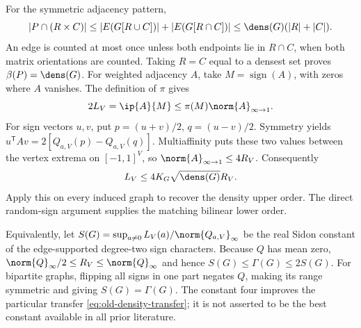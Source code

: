 For the symmetric adjacency pattern,
\[
 |P\cap(R\times C)|\le|E(G[R\cup C])|+|E(G[R\cap C])|
                   \le\dens(G)(|R|+|C|).
\]
An edge is counted at most once unless both endpoints lie in $R\cap C$,
when both matrix orientations are counted. Taking $R=C$ equal to a densest
set proves $\beta(P)=\dens(G)$. For weighted adjacency $A$, take
$M=\operatorname{sign}(A)$, with zeros where $A$ vanishes. The definition
of $\pi$ gives
\[
 2L_V=\ip{A}{M}\le\pi(M)\norm{A}_{\infty\to1}.
\]
For sign vectors $u,v$, put $p=(u+v)/2$, $q=(u-v)/2$. Symmetry yields
$u^{\mathsf T}Av=2[Q_{a,V}(p)-Q_{a,V}(q)]$. Multiaffinity puts these two
values between the vertex extrema on $[-1,1]^V$, so
$\norm{A}_{\infty\to1}\le4R_V$. Consequently
\begin{equation}\label{eq:old-density-transfer}
 L_V\le4K_G\sqrt{\dens(G)}R_V.
\end{equation}
Apply this on every induced graph to recover the density upper order.
The direct random-sign argument supplies the matching bilinear lower order.

Equivalently, let
$S(G)=\sup_{a\ne0}L_V(a)/\norm{Q_{a,V}}_\infty$ be the real Sidon
constant of the edge-supported degree-two sign characters. Because $Q$
has mean zero,
$\norm{Q}_\infty/2\le R_V\le\norm{Q}_\infty$ and hence
$S(G)\le\Gamma(G)\le2S(G)$. For bipartite graphs, flipping all signs in
one part negates $Q$, making its range symmetric and giving
$S(G)=\Gamma(G)$. The constant four improves the particular transfer
\eqref{eq:old-density-transfer}; it is not asserted to be the best constant
available in all prior literature.
